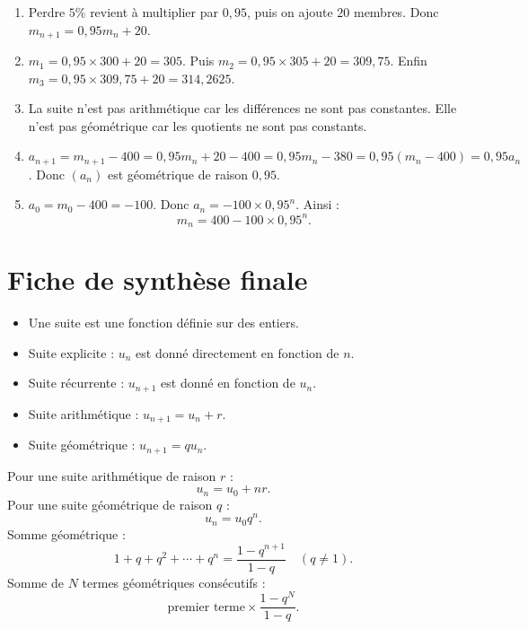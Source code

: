 \documentclass[11pt,a4paper]{article}
\begin{document}
\begin{correctionbox}[Exercice 4]
\begin{enumerate}
  \item Perdre $5\%$ revient à multiplier par $0{,}95$, puis on ajoute $20$ membres. Donc $m_{n+1}=0{,}95m_n+20$.
  \item $m_1=0{,}95\times300+20=305$. Puis $m_2=0{,}95\times305+20=309{,}75$. Enfin $m_3=0{,}95\times309{,}75+20=314{,}2625$.
  \item La suite n'est pas arithmétique car les différences ne sont pas constantes. Elle n'est pas géométrique car les quotients ne sont pas constants.
  \item $a_{n+1}=m_{n+1}-400=0{,}95m_n+20-400=0{,}95m_n-380=0{,}95(m_n-400)=0{,}95a_n$. Donc $(a_n)$ est géométrique de raison $0{,}95$.
  \item $a_0=m_0-400=-100$. Donc $a_n=-100\times0{,}95^n$. Ainsi :
  \[
  m_n=400-100\times0{,}95^n.
  \]
\end{enumerate}
\end{correctionbox}

\newpage
\section{Fiche de synthèse finale}

\begin{rememberbox}
\begin{itemize}
  \item Une suite est une fonction définie sur des entiers.
  \item Suite explicite : $u_n$ est donné directement en fonction de $n$.
  \item Suite récurrente : $u_{n+1}$ est donné en fonction de $u_n$.
  \item Suite arithmétique : $u_{n+1}=u_n+r$.
  \item Suite géométrique : $u_{n+1}=qu_n$.
\end{itemize}
\end{rememberbox}

\begin{rememberbox}
Pour une suite arithmétique de raison $r$ :
\[
 u_n=u_0+nr.
\]
Pour une suite géométrique de raison $q$ :
\[
 u_n=u_0q^n.
\]
Somme géométrique :
\[
1+q+q^2+\cdots+q^n=\frac{1-q^{n+1}}{1-q}\quad(q\neq1).
\]
Somme de $N$ termes géométriques consécutifs :
\[
\text{premier terme}\times\frac{1-q^N}{1-q}.
\]
\end{rememberbox}
\end{document}
